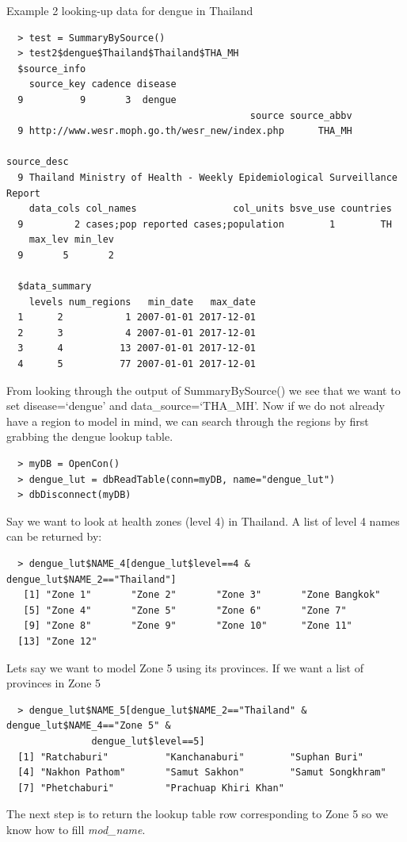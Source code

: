 \documentclass[a4paper]{article}
\begin{document}
Example 2 looking-up data for dengue in Thailand
\begin{verbatim}
  > test = SummaryBySource()
  > test2$dengue$Thailand$Thailand$THA_MH
  $source_info
    source_key cadence disease
  9          9       3  dengue
                                           source source_abbv
  9 http://www.wesr.moph.go.th/wesr_new/index.php      THA_MH
                                                                 source_desc
  9 Thailand Ministry of Health - Weekly Epidemiological Surveillance Report
    data_cols col_names                 col_units bsve_use countries
  9         2 cases;pop reported cases;population        1        TH
    max_lev min_lev
  9       5       2

  $data_summary
    levels num_regions   min_date   max_date
  1      2           1 2007-01-01 2017-12-01
  2      3           4 2007-01-01 2017-12-01
  3      4          13 2007-01-01 2017-12-01
  4      5          77 2007-01-01 2017-12-01
\end{verbatim}
From looking through the output of SummaryBySource() we see that we want to set disease=`dengue' and data\_source=`THA\_MH'.  Now if we do not already have a region to model in mind, we can search through the regions by first grabbing the dengue lookup table.
\begin{verbatim}
  > myDB = OpenCon()
  > dengue_lut = dbReadTable(conn=myDB, name="dengue_lut")
  > dbDisconnect(myDB)
\end{verbatim}
Say we want to look at health zones (level 4) in Thailand.  A list of level 4 names can be returned by:
\begin{verbatim}
  > dengue_lut$NAME_4[dengue_lut$level==4 & dengue_lut$NAME_2=="Thailand"]
   [1] "Zone 1"       "Zone 2"       "Zone 3"       "Zone Bangkok"
   [5] "Zone 4"       "Zone 5"       "Zone 6"       "Zone 7"
   [9] "Zone 8"       "Zone 9"       "Zone 10"      "Zone 11"
  [13] "Zone 12"
\end{verbatim}
Lets say we want to model Zone 5 using its provinces.  If we want a list of provinces in Zone 5
\begin{verbatim}
  > dengue_lut$NAME_5[dengue_lut$NAME_2=="Thailand" & dengue_lut$NAME_4=="Zone 5" &
               dengue_lut$level==5]
  [1] "Ratchaburi"          "Kanchanaburi"        "Suphan Buri"
  [4] "Nakhon Pathom"       "Samut Sakhon"        "Samut Songkhram"
  [7] "Phetchaburi"         "Prachuap Khiri Khan"
\end{verbatim}
The next step is to return the lookup table row corresponding to Zone 5 so we know how to fill \textit{mod\_name}.
\end{document}
